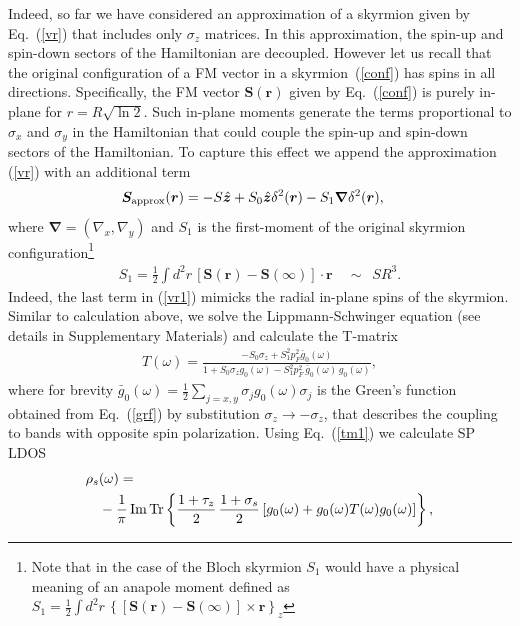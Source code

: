 \documentclass[twocolumn,showpacs,floatfix,longbibliography]{revtex4-1}
\begin{document}
Indeed, so far we have considered an approximation of a skyrmion given by Eq.~(\ref{vr}) that includes only $\sigma_z$ matrices. In this approximation, the spin-up and spin-down sectors of the Hamiltonian are decoupled. However let us recall that the original configuration of a FM vector in a skyrmion~(\ref{conf}) has spins in all directions. Specifically, the FM vector $\bm S(\bm r)$ given by Eq.~(\ref{conf}) is purely in-plane for $r = R \sqrt{\ln 2}$. Such in-plane moments generate the terms proportional to $\sigma_x$ and $\sigma_y$ in the Hamiltonian that could couple the spin-up and spin-down sectors of the Hamiltonian. To capture this effect we append the approximation (\ref{vr}) with an additional term 
\begin{align}
	\bm S_{\rm approx}(\bm r) & =  - S \hat{\bm z} + S_0 \hat{\bm z} \delta^2(\bm r)-S_1 \bm \nabla \delta^2(\bm r), \label{vr1}
\end{align}
where  $\bm \nabla = (\nabla_x,\nabla_y)$ and $S_1$ is the first-moment of the original skyrmion configuration\footnote{Note that in the case of the Bloch skyrmion $S_1$ would have a physical meaning of an anapole moment defined as $S_1 = \frac{1}{2}\int  d^2r \, \left\{\left[\bm S(\bm r)-\bm S(\infty)\right] \times \bm r\right\}_z$ }
\begin{align}
	S_1 = \frac{1}{2}\int  d^2r \, \left[\bm S(\bm r)-\bm S(\infty)\right] \cdot \bm r\quad \sim \,\,\,SR^3. \label{S1}
\end{align}
Indeed, the last term in (\ref{vr1}) mimicks the radial in-plane spins of the skyrmion. Similar to calculation above, we solve the Lippmann-Schwinger equation (see details in Supplementary Materials) and calculate the T-matrix 
\begin{align}
	T(\omega) =   \frac{-S_0\sigma_z+S^2_1p_F^2\bar g_{0}(\omega)}{1+S_0\sigma_zg_{0}(\omega)-S^2_1p_F^2\,\bar g_{0}(\omega)\, g_{0}(\omega)}, \label{tm1} 
\end{align}
where for brevity $\bar g_0(\omega) = \frac{1}{2}\sum_{j=x,y} \sigma_j g_0(\omega) \sigma_j $ is the Green's function obtained from Eq.~(\ref{grf}) by substitution $\sigma_z\rightarrow -\sigma_z$, that describes the coupling to bands with opposite spin polarization. Using Eq.~(\ref{tm1}) we calculate SP LDOS 
\begin{align}
	\rho_s & (\omega) = \label{ldos} \\ 
	&-\frac{1}{\pi}\,{\rm Im}{\rm \,Tr} \left\{  \frac{1+\tau_z}{2}\,\frac{1+\sigma_s}{2} \left[g_0(\omega)+g_0(\omega) T(\omega) g_0(\omega)  \right]\right\},\nonumber 
 \end{align}
\end{document}
